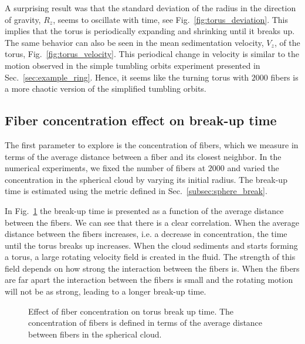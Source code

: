 A surprising result was that the standard deviation of the radius in the direction of gravity, $R_z$, seems to oscillate with time, see Fig.~\ref{fig:torus_deviation}. This implies that the torus is periodically expanding and shrinking until it breaks up. The same behavior can also be seen in the mean sedimentation velocity, $V_z$, of the torus, Fig.~\ref{fig:torus_velocity}. This periodical change in velocity is similar to the motion observed in the simple tumbling orbits experiment presented in Sec.~\ref{sec:example_ring}. Hence, it seems like the turning torus with $2000$ fibers is a more chaotic version of the simplified tumbling orbits.

\subsection{Fiber concentration effect on break-up time}
\label{subsec:effect_concentration}

The first parameter to explore is the concentration of fibers, which we measure in terms of the average distance between a fiber and its closest neighbor. In the numerical experiments, we fixed the number of fibers at $2000$ and varied the concentration in the spherical cloud by varying its initial radius. The break-up time is estimated using the metric defined in Sec.~\ref{subsec:sphere_break}.

In Fig.~\ref{fig:concentration_breakup} the break-up time is presented as a function of the average distance between the fibers. We can see that there is a clear correlation. When the average distance between the fibers increases, i.e. a decrease in concentration, the time until the torus breaks up increases. When the cloud sediments and starts forming a torus, a large rotating velocity field is created in the fluid. The strength of this field depends on how strong the interaction between the fibers is. When the fibers are far apart the interaction between the fibers is small and the rotating motion will not be as strong, leading to a longer break-up time.

\begin{figure}[!htbp]
  \centering
  \caption[Effect of fiber concentration on torus break up time.]{Effect of fiber concentration on torus break up time. The concentration of fibers is defined in terms of the average distance between fibers in the spherical cloud.}
  \label{fig:concentration_breakup}
\end{figure}


